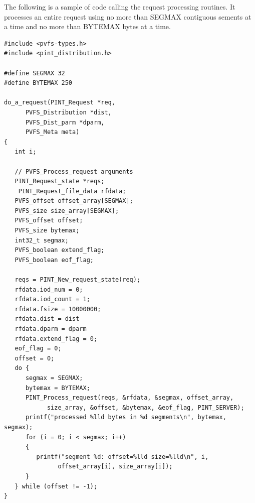 \documentclass[12pt]{article} %
\begin{document}
The following is a sample of code calling the request processing
routines.  It processes an entire request using no more than SEGMAX
contiguous sements at a time and no more than BYTEMAX bytes at a time.

\begin{verbatim}
#include <pvfs-types.h>
#include <pint_distribution.h>

#define SEGMAX 32
#define BYTEMAX 250

do_a_request(PINT_Request *req,
      PVFS_Distribution *dist,
      PVFS_Dist_parm *dparm,
      PVFS_Meta meta)
{
   int i;

   // PVFS_Process_request arguments
   PINT_Request_state *reqs;
	PINT_Request_file_data rfdata;
   PVFS_offset offset_array[SEGMAX];
   PVFS_size size_array[SEGMAX];
   PVFS_offset offset;
   PVFS_size bytemax;
   int32_t segmax;
   PVFS_boolean extend_flag;
   PVFS_boolean eof_flag;

   reqs = PINT_New_request_state(req);
   rfdata.iod_num = 0;
   rfdata.iod_count = 1;
   rfdata.fsize = 10000000;
   rfdata.dist = dist
   rfdata.dparm = dparm
   rfdata.extend_flag = 0;
   eof_flag = 0;
   offset = 0;
   do {
      segmax = SEGMAX;
      bytemax = BYTEMAX;
      PINT_Process_request(reqs, &rfdata, &segmax, offset_array,
            size_array, &offset, &bytemax, &eof_flag, PINT_SERVER);
      printf("processed %lld bytes in %d segments\n", bytemax, segmax);
      for (i = 0; i < segmax; i++)
      {
         printf("segment %d: offset=%lld size=%lld\n", i,
               offset_array[i], size_array[i]);
      }
   } while (offset != -1);
}
\end{verbatim}
\end{document}
